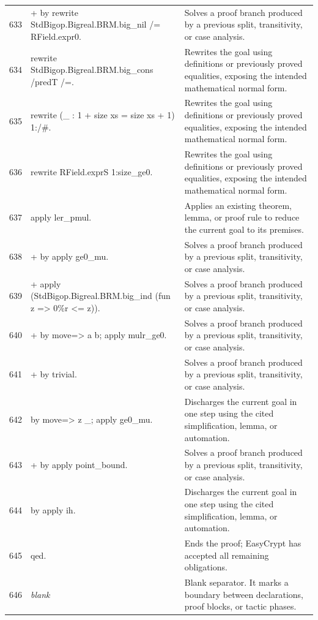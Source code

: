 \documentclass[10pt]{article}
\begin{document}
\begin{longtable}{r L{0.53\textwidth} L{0.37\textwidth}}
633 & {\ttfamily\scriptsize + by rewrite StdBigop.Bigreal.BRM.big\_nil /= RField.expr0.} & Solves a proof branch produced by a previous split, transitivity, or case analysis. \\
634 & {\ttfamily\scriptsize rewrite StdBigop.Bigreal.BRM.big\_cons /predT /=.} & Rewrites the goal using definitions or previously proved equalities, exposing the intended mathematical normal form. \\
635 & {\ttfamily\scriptsize rewrite (\_ : 1 + size xs = size xs + 1) 1:/\#.} & Rewrites the goal using definitions or previously proved equalities, exposing the intended mathematical normal form. \\
636 & {\ttfamily\scriptsize rewrite RField.exprS 1:size\_ge0.} & Rewrites the goal using definitions or previously proved equalities, exposing the intended mathematical normal form. \\
637 & {\ttfamily\scriptsize apply ler\_pmul.} & Applies an existing theorem, lemma, or proof rule to reduce the current goal to its premises. \\
638 & {\ttfamily\scriptsize + by apply ge0\_mu.} & Solves a proof branch produced by a previous split, transitivity, or case analysis. \\
639 & {\ttfamily\scriptsize + apply (StdBigop.Bigreal.BRM.big\_ind (fun z => 0\%r <= z)).} & Solves a proof branch produced by a previous split, transitivity, or case analysis. \\
640 & {\ttfamily\scriptsize   + by move=> a b; apply mulr\_ge0.} & Solves a proof branch produced by a previous split, transitivity, or case analysis. \\
641 & {\ttfamily\scriptsize   + by trivial.} & Solves a proof branch produced by a previous split, transitivity, or case analysis. \\
642 & {\ttfamily\scriptsize   by move=> z \_; apply ge0\_mu.} & Discharges the current goal in one step using the cited simplification, lemma, or automation. \\
643 & {\ttfamily\scriptsize + by apply point\_bound.} & Solves a proof branch produced by a previous split, transitivity, or case analysis. \\
644 & {\ttfamily\scriptsize by apply ih.} & Discharges the current goal in one step using the cited simplification, lemma, or automation. \\
645 & {\ttfamily\scriptsize qed.} & Ends the proof; EasyCrypt has accepted all remaining obligations. \\
646 & {\ttfamily\scriptsize \emph{blank}} & Blank separator.  It marks a boundary between declarations, proof blocks, or tactic phases. \\

\end{longtable}
\end{document}
